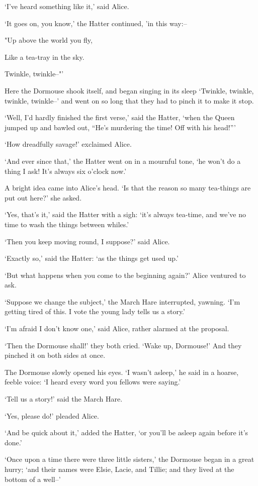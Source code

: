 \documentclass[statementpaper,twoside,openany]{memoir}
\begin{document}
`I've heard something like it,' said Alice.

`It goes on, you know,' the Hatter continued, 'in this way:--

"Up above the world you fly,

Like a tea-tray in the sky.

Twinkle, twinkle--"'

Here the Dormouse shook itself, and began singing in its sleep `Twinkle, twinkle, twinkle, twinkle--' and went on so long that they had to pinch it to make it stop.

`Well, I'd hardly finished the first verse,' said the Hatter, `when the Queen jumped up and bawled out, ``He's murdering the time! Off with his head!'''

`How dreadfully savage!' exclaimed Alice.

`And ever since that,' the Hatter went on in a mournful tone, `he won't do a thing I ask! It's always six o'clock now.'

A bright idea came into Alice's head. `Is that the reason so many tea-things are put out here?' she asked.

`Yes, that's it,' said the Hatter with a sigh: `it's always tea-time, and we've no time to wash the things between whiles.'

`Then you keep moving round, I suppose?' said Alice.

`Exactly so,' said the Hatter: `as the things get used up.'

`But what happens when you come to the beginning again?' Alice ventured to ask.

`Suppose we change the subject,' the March Hare interrupted, yawning. `I'm getting tired of this. I vote the young lady tells us a story.'

`I'm afraid I don't know one,' said Alice, rather alarmed at the proposal.

`Then the Dormouse shall!' they both cried. `Wake up, Dormouse!' And they pinched it on both sides at once.

The Dormouse slowly opened his eyes. `I wasn't asleep,' he said in a hoarse, feeble voice: `I heard every word you fellows were saying.'

`Tell us a story!' said the March Hare.

`Yes, please do!' pleaded Alice.

`And be quick about it,' added the Hatter, `or you'll be asleep again before it's done.'

`Once upon a time there were three little sisters,' the Dormouse began in a great hurry; `and their names were Elsie, Lacie, and Tillie; and they lived at the bottom of a well--'
\end{document}
